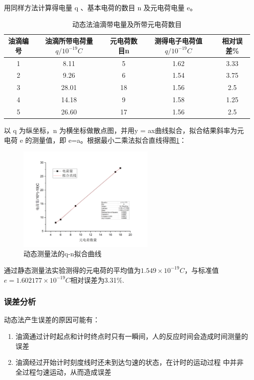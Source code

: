\documentclass[12pt,a4paper,UTF8]{ctexart}
\begin{document}
用同样方法计算得电量 q 、基本电荷的数目 n 及元电荷电量 e。

\begin{table}[!h]
	\centering
	\caption{动态法油滴带电量及所带元电荷数目}	  
	\begin{tabular}{ccccc}
	\toprule
	油滴编号 & \makecell[c]{油滴所带电荷量\\$q/10^{-19}C$} & 元电荷数目n & \makecell[c]{测得电子电荷值\\$q/10^{-19}C$} & 相对误差\%\\
	\midrule
	1 & 8.11 & 5 & 1.62 & 3.33 \\
	2 & 9.26 & 6 & 1.54 & 3.75 \\
	3 & 28.01 & 18 & 1.56 & 2.5 \\
	4 & 14.18 & 9 & 1.58 & 1.25 \\
	5 & 26.60 & 17 & 1.56 & 2.5 \\
	\bottomrule
\end{tabular}%
\label{tab:5}
\end{table}%

以 q 为纵坐标，n 为横坐标做散点图，并用y = ax曲线拟合，拟合结果斜率为元电荷 e 的测量值，即 e=a。根据最小二乘法拟合直线得图\ref*{fig:2}：

\begin{figure}[!h]
	\centering
	\includegraphics[width=0.6\textwidth]{img//2.png}
	\caption{动态测量法的q-n拟合曲线}
	\label{fig:2}
\end{figure}

通过静态测量法实验测得的元电荷的平均值为$1.549 \times 10^{-19}C$，与标准值$e =1.602177\times 10^{-19}C$相对误差为3.31\%.

\subsubsection*{误差分析}
动态法产生误差的原因可能有：
\begin{enumerate}
	\item 油滴通过计时起点和计时终点时只有一瞬间，人的反应时间会造成时间测量的误差
	\item 油滴经过开始计时刻度线时还未到达匀速的状态，在计时的运动过程 中并非全过程匀速运动，从而造成误差
\end{enumerate}
\end{document}
